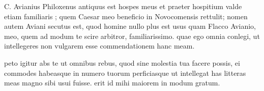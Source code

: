 


 C. Avianius Philoxenus antiquus est hospes meus et praeter hospitium valde etiam familiaris ; quem Caesar meo beneficio in Novocomensis rettulit; nomen autem Aviani secutus est, quod homine nullo plus est usus quam Flacco Avianio, meo, quem ad modum te scire arbitror, familiarissimo. quae ego omnia conlegi, ut intellegeres non vulgarem esse commendationem hanc meam.

 peto igitur abs te ut omnibus rebus, quod sine molestia tua facere possis, ei commodes habeasque in numero tuorum perficiasque ut intellegat has litteras meas magno sibi usui fuisse. erit id mihi maiorem in modum gratum.
